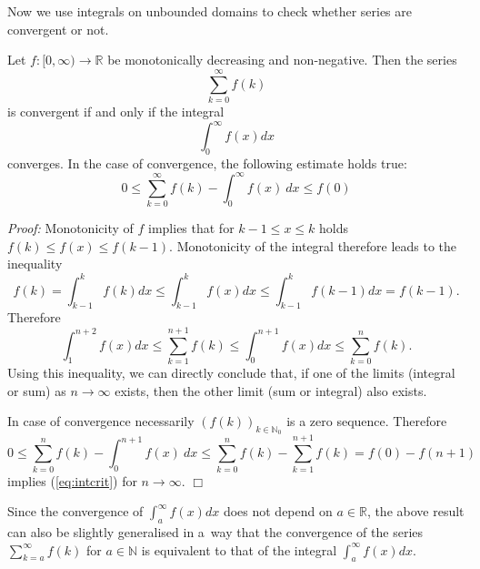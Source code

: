 

Now we use integrals on unbounded domains to check whether series are convergent or not.
\begin{Theorem}
Let $f:[0,\infty)\to\mathbb{R}$ be monotonically decreasing and non-negative. Then the series
\[\sum_{k=0}^{\infty}f(k)\]
is convergent if and only if the integral
\[\int_{0}^{\infty}f(x)dx\]
converges.
In the case of convergence, the following estimate holds true:
\begin{equation}
\label{eq:intcrit} 
	0\leq \sum_{k=0}^\infty f(k) -\int_0^\infty f(x)~dx\leq f(0)
\end{equation}
\end{Theorem}
{\em Proof:} Monotonicity of $f$ implies that for $k-1\leq x\leq k$ holds $f(k)\leq f(x)\leq f(k-1)$. Monotonicity of the integral therefore leads to the inequality
\[f(k)=\int_{k-1}^kf(k)dx\leq \int_{k-1}^kf(x)dx\leq \int_{k-1}^kf(k-1)dx=f(k-1).\]
Therefore
\[\int_1^{n+2}f(x)dx\leq\sum_{k=1}^{n+1} f(k)\leq \int_0^{n+1}f(x)dx\leq \sum_{k=0}^{n} f(k).\]
Using this inequality, we can directly conclude that, if one of the limits (integral or sum) as $n\to\infty$ exists, then the other limit (sum or integral) also exists.

In case of convergence necessarily $(f(k))_{k\in\mathbb{N}_0}$ is a zero sequence. Therefore
\[0\leq \sum_{k=0}^n f(k) -\int_0^{n+1} f(x)~dx\leq \sum_{k=0}^n f(k) - \sum_{k=1}^{n+1}f(k) =f(0)-f(n+1)\]
implies (\ref{eq:intcrit}) for $n\rightarrow \infty$.
$\Box$

\begin{Remark}{}
Since the convergence of $\int_{a}^{\infty}f(x)dx$ does not depend on $a\in\mathbb{R}$, the above result can also be slightly generalised in a~way that
the convergence of the series $\sum_{k=a}^{\infty}f(k)$ for $a\in\mathbb{N}$ is equivalent to that of the integral $\int_{a}^{\infty}f(x)dx$.
\end{Remark}

